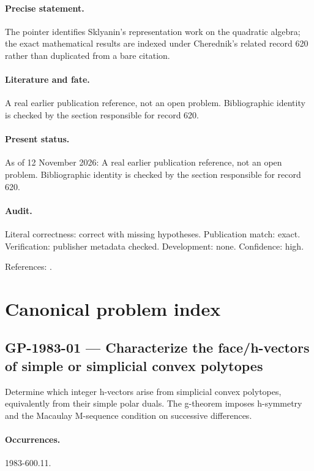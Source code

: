 \paragraph{Precise statement.} The pointer identifies Sklyanin's representation work on the quadratic algebra; the exact mathematical results are indexed under Cherednik's related record 620 rather than duplicated from a bare citation.

\paragraph{Literature and fate.} A real earlier publication reference, not an open problem. Bibliographic identity is checked by the section responsible for record 620.

\paragraph{Present status.} As of 12 November 2026: A real earlier publication reference, not an open problem. Bibliographic identity is checked by the section responsible for record 620.

\paragraph{Audit.} Literal correctness: correct with missing hypotheses. Publication match: exact. Verification: publisher metadata checked. Development: none. Confidence: high.

\noindent References: \citep{sklyanin1983representations}.\par

\section{Canonical problem index}

\subsection{GP-1983-01 --- Characterize the face/h-vectors of simple or simplicial convex polytopes}

\label{problem:GP-1983-01}

Determine which integer h-vectors arise from simplicial convex polytopes, equivalently from their simple polar duals. The g-theorem imposes h-symmetry and the Macaulay M-sequence condition on successive differences.

\paragraph{Occurrences.} 1983-600.11.

